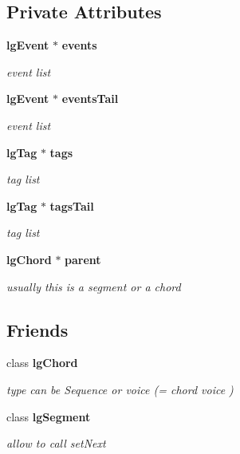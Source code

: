 \subsection*{Private Attributes}
\begin{CompactItemize}
\item 
{\bf lg\-Event} $\ast$ {\bf events}
\begin{CompactList}\small\item\em event list \item\end{CompactList}\item 
{\bf lg\-Event} $\ast$ {\bf events\-Tail}
\begin{CompactList}\small\item\em event list \item\end{CompactList}\item 
{\bf lg\-Tag} $\ast$ {\bf tags}
\begin{CompactList}\small\item\em tag list \item\end{CompactList}\item 
{\bf lg\-Tag} $\ast$ {\bf tags\-Tail}
\begin{CompactList}\small\item\em tag list \item\end{CompactList}\item 
{\bf lg\-Chord} $\ast$ {\bf parent}
\begin{CompactList}\small\item\em usually this is a segment or a chord \item\end{CompactList}\end{CompactItemize}
\subsection*{Friends}
\begin{CompactItemize}
\item 
class {\bf lg\-Chord}
\begin{CompactList}\small\item\em type can be Sequence or voice (= chord voice ) \item\end{CompactList}\item 
class {\bf lg\-Segment}
\begin{CompactList}\small\item\em allow to call set\-Next \item\end{CompactList}\end{CompactItemize}


